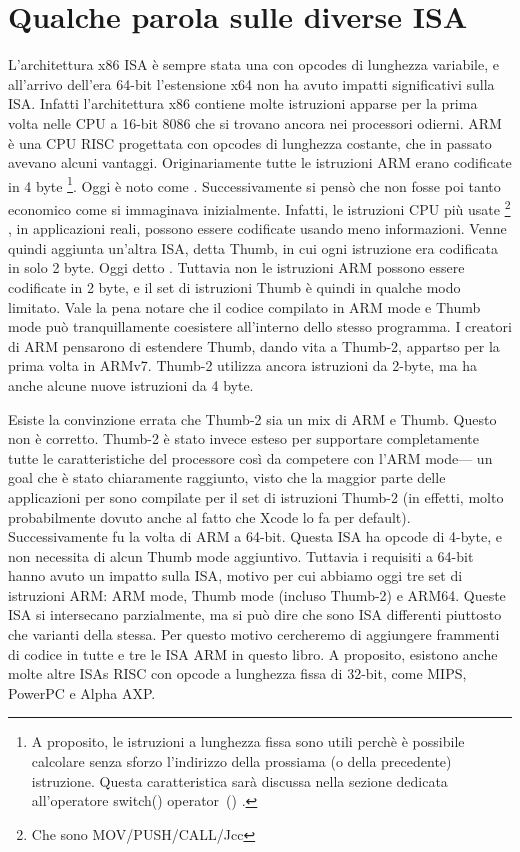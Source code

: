 \ifx\LITE\undefined
{}%
%
%

\section{Qualche parola sulle diverse \ac{ISA}}
L'architettura x86 \ac{ISA} è sempre stata una con opcodes di lunghezza variabile, e all'arrivo dell'era 64-bit l'estensione x64 non ha avuto impatti significativi sulla \ac{ISA}. Infatti l'architettura x86 contiene molte istruzioni apparse per la prima volta nelle CPU a 16-bit 8086 che si trovano ancora nei processori odierni.
ARM è una \ac{CPU} \ac{RISC} progettata con opcodes di lunghezza costante, che in passato avevano alcuni vantaggi.
Originariamente tutte le istruzioni ARM erano codificate in 4 byte%
\footnote{
A proposito, le istruzioni a lunghezza fissa sono utili perchè è possibile calcolare senza sforzo l'indirizzo della prossiama (o della precedente) istruzione. Questa caratteristica sarà discussa nella sezione dedicata all'operatore switch() operator~() .
}.
Oggi è noto come .
Successivamente si pensò che non fosse poi tanto economico come si immaginava inizialmente.
Infatti, le istruzioni \ac{CPU} più usate \footnote{Che sono MOV/PUSH/CALL/Jcc} , in applicazioni reali, possono essere codificate usando meno informazioni.
Venne quindi aggiunta un'altra \ac{ISA}, detta Thumb, in cui ogni istruzione era codificata in solo 2 byte.
Oggi detto .
Tuttavia non  le istruzioni ARM possono essere codificate in 2 byte, e il set di istruzioni Thumb è quindi in qualche modo limitato.
Vale la pena notare che il codice compilato in ARM mode e Thumb mode può tranquillamente coesistere all'interno dello stesso programma.
I creatori di ARM pensarono di estendere Thumb, dando vita a Thumb-2, appartso per la prima volta in ARMv7.
Thumb-2 utilizza ancora istruzioni da 2-byte, ma ha anche alcune nuove istruzioni da 4 byte. 

Esiste la convinzione errata che Thumb-2 sia un mix di ARM e Thumb. Questo non è corretto. 
Thumb-2 è stato invece esteso per supportare completamente tutte le caratteristiche del processore così da competere con l'ARM mode--- un goal che è stato chiaramente raggiunto, visto che la maggior parte delle applicazioni per \idevices sono compilate per il set di istruzioni Thumb-2 (in effetti, molto probabilmente dovuto anche al fatto che Xcode lo fa per default).
Successivamente fu la volta di ARM a 64-bit. Questa \ac{ISA} ha opcode di 4-byte, e non necessita di alcun Thumb mode aggiuntivo.
Tuttavia i requisiti a 64-bit hanno avuto un impatto sulla \ac{ISA}, motivo per cui abbiamo oggi tre set di istruzioni ARM: ARM mode, Thumb mode (incluso Thumb-2) e ARM64.
Queste \ac{ISA} si intersecano parzialmente, ma si può dire che sono \ac{ISA} differenti piuttosto che varianti della stessa.
Per questo motivo cercheremo di aggiungere frammenti di codice in tutte e tre le \ac{ISA} ARM in questo libro.
%
%
%
A proposito, esistono anche molte altre \ac{ISA}s \ac{RISC} con opcode a lunghezza fissa di 32-bit, come MIPS, PowerPC e Alpha AXP.
\fi %
\fi %

